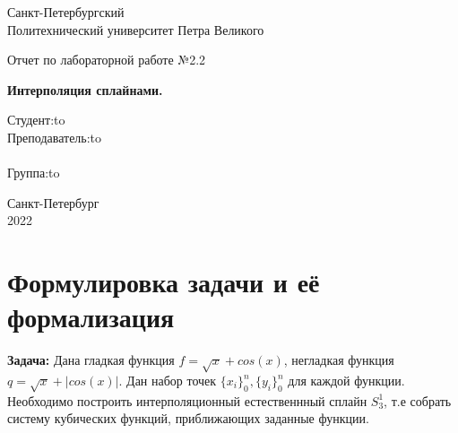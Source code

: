 \documentclass[12pt]{article}
\begin{document}
\begin{titlepage}
\Large

\begin{center}
Санкт-Петербургский \\ Политехнический университет Петра Великого

\vspace{10em}

Отчет по лабораторной работе №2.2\\

\vspace{2em}

\textbf{Интерполяция сплайнами.}
\end{center}

\vspace{6em}

\newbox{\lbox}
\newlength{\maxl}
\setlength{\maxl}{\wd\lbox}
\hfill\parbox{14cm}{
\hspace*{5cm}\hspace*{-5cm}Студент:\hfill\hbox to\\
\hspace*{5cm}\hspace*{-5cm}Преподаватель:\hfill\hbox to\\
\\
\hspace*{5cm}\hspace*{-5cm}Группа:\hfill\hbox to\\}

\vspace{\fill}
\begin{center}
Санкт-Петербург \\2022
\end{center}
\end{titlepage}
\section{Формулировка задачи и её формализация}
\textbf{Задача:} Дана гладкая функция $f = \sqrt{x} + cos(x)$, негладкая функция $q = \sqrt{x} + |cos(x)|$. Дан набор точек $\displaystyle \{{x_i}\}_0^n, \{{y_i}\}_0^n$ для каждой функции. Необходимо построить интерполяционный естественнный сплайн $\displaystyle S_3^1$, т.е собрать систему кубических функций, приближающих заданные функции. 
\end{document}
